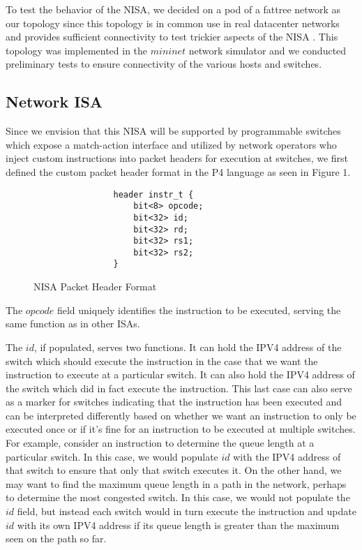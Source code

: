 To test the behavior of the NISA, we decided on a pod of a fattree network as our topology since this topology is in common use in real datacenter networks and provides sufficient connectivity to test trickier aspects of the NISA \cite{fattree}. This topology was implemented in the $mininet$ network simulator and we conducted preliminary tests to ensure connectivity of the various hosts and switches.

\subsection{Network ISA}

Since we envision that this NISA will be supported by programmable switches which expose a match-action interface and utilized by network operators who inject custom instructions into packet headers for execution at switches, we first defined the custom packet header format in the P4 language as seen in Figure 1. 

\begin{figure}[tp]
\centering
\begin{verbatim}
                header instr_t {
                    bit<8> opcode;
                    bit<32> id;
                    bit<32> rd;
                    bit<32> rs1;
                    bit<32> rs2;
                }
\end{verbatim}
\caption{NISA Packet Header Format}
\end{figure}

The $opcode$ field uniquely identifies the instruction to be executed, serving the same function as in other ISAs. 

The $id$, if populated, serves two functions. It can hold the IPV4 address of the switch which should execute the instruction in the case that we want the instruction to execute at a particular switch. It can also hold the IPV4 address of the switch which did in fact execute the instruction. This last case can also serve as a marker for switches indicating that the instruction has been executed and can be interpreted differently based on whether we want an instruction to only be executed once or if it's fine for an instruction to be executed at multiple switches. For example, consider an instruction to determine the queue length at a particular switch. In this case, we would populate $id$ with the IPV4 address of that switch to ensure that only that switch executes it. On the other hand, we may want to find the maximum queue length in a path in the network, perhaps to determine the most congested switch. In this case, we would not populate the $id$ field, but instead each switch would in turn execute the instruction and update $id$ with its own IPV4 address if its queue length is greater than the maximum seen on the path so far.

